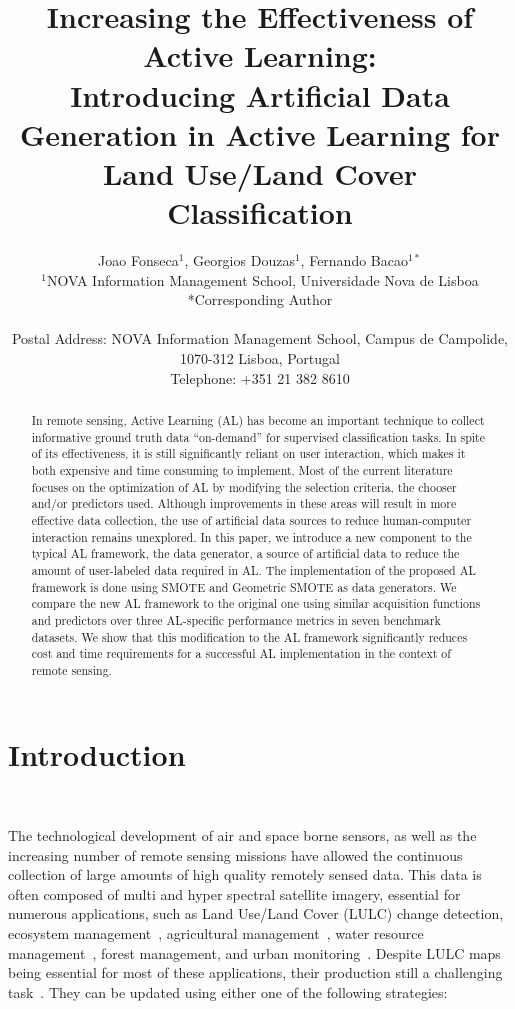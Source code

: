 \documentclass[parskip=full]{scrartcl}
\title{Increasing the Effectiveness of Active Learning:\\ 
	\LARGE{Introducing Artificial Data Generation in Active Learning for Land Use/Land Cover Classification}}
\author{
	Joao Fonseca\(^{1}\), Georgios Douzas\(^{1}\), Fernando Bacao\(^{1*}\) 
	\\
	\small{\(^{1}\)NOVA Information Management School, Universidade Nova de Lisboa}
	\\
	\small{*Corresponding Author}
	\\
	\\
	\small{Postal Address: NOVA Information Management School, Campus de Campolide, 1070-312 Lisboa, Portugal}
	\\
	\small{Telephone: +351 21 382 8610}
}
\date{}
\begin{document}
\maketitle

\begin{abstract}
    In remote sensing, Active Learning (AL) has become an important technique
    to collect informative ground truth data ``on-demand'' for supervised
    classification tasks.  In spite of its effectiveness, it is still
    significantly reliant on user interaction, which makes it both expensive
    and time consuming to implement.  Most of the current literature focuses on
    the optimization of AL by modifying the selection criteria, the chooser
    and/or predictors used.  Although improvements in these areas will result
    in more effective data collection, the use of artificial data sources to
    reduce human-computer interaction remains unexplored. In this paper, we
    introduce a new component to the typical AL framework, the data generator,
    a source of artificial data to reduce the amount of user-labeled data
    required in AL\@.  The implementation of the proposed AL framework is done
    using SMOTE and Geometric SMOTE as data generators.  We compare the new AL
    framework to the original one using similar acquisition functions and
    predictors over three AL-specific performance metrics in seven benchmark
    datasets. We show that this modification to the AL framework significantly
    reduces cost and time requirements for a successful AL implementation in
    the context of remote sensing. 
\end{abstract}

\section{Introduction}~\label{sec:introduction}

The technological development of air and space borne sensors, as well as the
increasing number of remote sensing missions have allowed the continuous
collection of large amounts of high quality remotely sensed data. This data is
often composed of multi and hyper spectral satellite imagery, essential for
numerous applications, such as Land Use/Land Cover (LULC) change detection,
ecosystem management~\cite{Nagai2020}, agricultural
management~\cite{Huang2018}, water resource management~\cite{Wang2018}, forest
management, and urban monitoring~\cite{Khatami2016}. Despite LULC maps being
essential for most of these applications, their production still a challenging
task~\cite{Gavade2019, Wulder2018}. They can be updated using either one of the
following strategies:
\end{document}
